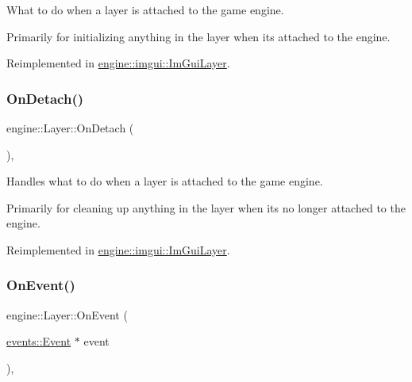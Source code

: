 What to do when a layer is attached to the game engine. 

Primarily for initializing anything in the layer when it\textquotesingle{}s attached to the engine. 

Reimplemented in \hyperlink{classengine_1_1imgui_1_1ImGuiLayer_a8580bd31942d4bc33f268053d2adec31}{engine\+::imgui\+::\+Im\+Gui\+Layer}.

\mbox{\label{classengine_1_1Layer_acfa7e624cfd2cb85803382511454d098}} 
\subsubsection{\texorpdfstring{On\+Detach()}{OnDetach()}}
{\footnotesize\ttfamily engine\+::\+Layer\+::\+On\+Detach (\begin{DoxyParamCaption}{ }\end{DoxyParamCaption})\hspace{0.3cm}{\ttfamily [inline]}, {\ttfamily [virtual]}}



Handles what to do when a layer is attached to the game engine. 

Primarily for cleaning up anything in the layer when it\textquotesingle{}s no longer attached to the engine. 

Reimplemented in \hyperlink{classengine_1_1imgui_1_1ImGuiLayer_ad443a984abe93f4101fdbadcea01bf9b}{engine\+::imgui\+::\+Im\+Gui\+Layer}.

\mbox{\label{classengine_1_1Layer_a982be4dc6ab1d3d71162719138312872}} 
\subsubsection{\texorpdfstring{On\+Event()}{OnEvent()}}
{\footnotesize\ttfamily engine\+::\+Layer\+::\+On\+Event (\begin{DoxyParamCaption}\item[{\hyperlink{classengine_1_1events_1_1Event}{events\+::\+Event} $\ast$}]{event }\end{DoxyParamCaption})\hspace{0.3cm}{\ttfamily [inline]}, {\ttfamily [virtual]}}



